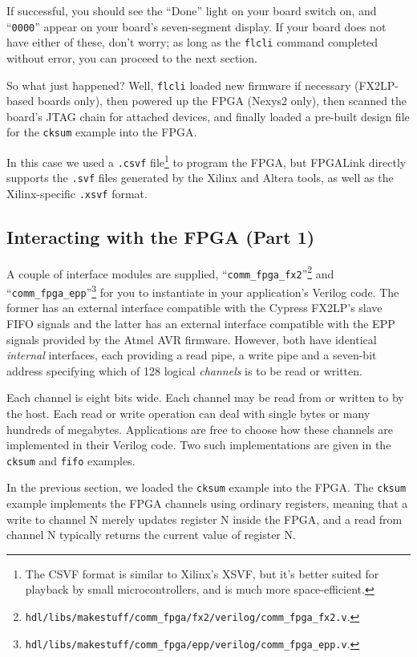 If successful, you should see the ``Done'' light on your board switch on, and ``\texttt{0000}'' appear on your board's seven-segment display. If your board does not have either of these, don't worry; as long as the \texttt{flcli} command completed without error, you can proceed to the next section.

So what just happened? Well, \texttt{flcli} loaded new firmware if necessary (FX2LP-based boards only), then powered up the FPGA (Nexys2 only), then scanned the board's JTAG chain for attached devices, and finally loaded a pre-built design file for the \texttt{cksum} example into the FPGA.

In this case we used a \texttt{.csvf} file\footnote{The CSVF format is similar to Xilinx's XSVF, but it's better suited for playback by small microcontrollers, and is much more space-efficient.} to program the FPGA, but FPGALink directly supports the \texttt{.svf} files generated by the Xilinx and Altera tools, as well as the Xilinx-specific \texttt{.xsvf} format.

\subsection{Interacting with the FPGA (Part 1)}
A couple of interface modules are supplied, ``\texttt{comm\_fpga\_fx2}''\footnote{\texttt{hdl/libs/makestuff/comm\_fpga/fx2/verilog/comm\_fpga\_fx2.v}.} and ``\texttt{comm\_fpga\_epp}''\footnote{\texttt{hdl/libs/makestuff/comm\_fpga/epp/verilog/comm\_fpga\_epp.v}.} for you to instantiate in your application's Verilog code. The former has an external interface compatible with the Cypress FX2LP's slave FIFO signals and the latter has an external interface compatible with the EPP signals provided by the Atmel AVR firmware. However, both have identical \textit{internal} interfaces, each providing a read pipe, a write pipe and a seven-bit address specifying which of 128 logical \textit{channels} is to be read or written.


Each channel is eight bits wide. Each channel may be read from or written to by the host. Each read or write operation can deal with single bytes or many hundreds of megabytes. Applications are free to choose how these channels are implemented in their Verilog code. Two such implementations are given in the \texttt{cksum} and \texttt{fifo} examples.

In the previous section, we loaded the \texttt{cksum} example into the FPGA. The \texttt{cksum} example implements the FPGA channels using ordinary registers, meaning that a write to channel N merely updates register N inside the FPGA, and a read from channel N typically returns the current value of register N.

